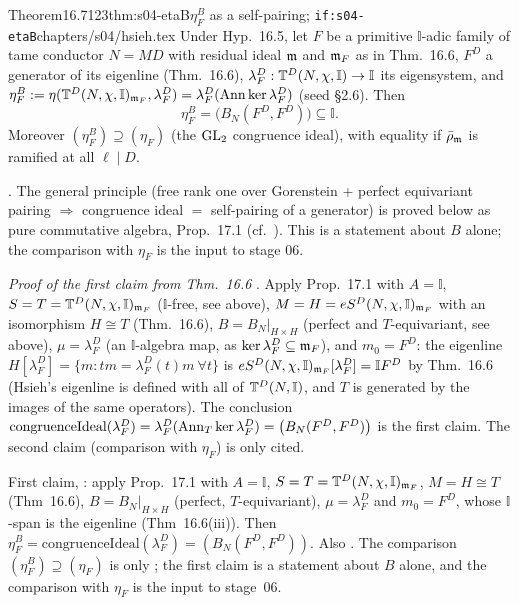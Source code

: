 \begin{quoted}{Theorem}{16.7}{123}{thm:s04-etaB}{$\eta^B_F$ as a self-pairing; \texttt{if:s04-etaB}}{chapters/s04/hsieh.tex}\label{rpt:thm:s04-etaB}
Under Hyp.~16.5, let $F$ be a primitive $\mathbb I$-adic family of tame conductor $N=MD$ with residual ideal $\mathfrak{m}$ and $\mathfrak{m}_F$ as in Thm.~16.6, $F^D$ a
generator of its eigenline (Thm.~16.6), $\lambda^D_F:\mathbb{T}^D(N,\chi,\mathbb I)\to\mathbb I$ its eigensystem, and
$\eta^B_F:=\eta(\mathbb{T}^D(N,\chi,\mathbb I)_{\mathfrak{m}_F},\lambda^D_F)=\lambda^D_F(\operatorname{Ann}\ker\lambda^D_F)$ (seed \S2.6). Then
\[\eta^B_F=\big(B_N(F^D,F^D)\big)\subseteq\mathbb I .\]
Moreover $(\eta^B_F)\supseteq(\eta_F)$ (the $\mathrm{GL}_2$ congruence ideal), with equality if $\bar\rho_{\mathfrak{m}}$ is ramified at all $\ell\mid D$.
\par\smallskip{}\par
\noindent\stcited{} \cite[{Def.~4.12, p.~43 ($\eta_{F^D}:=B_{N_F}(F^D,F^D)$);
Remark~7.8, p.~71 (it generates the congruence ideal of $\lambda_f:\T^D(N,\psi,\mathbb I)\to\mathbb I$ under (CR,$\Sigma^-$), and
$(\eta_{f^D})\supseteq(\eta_f)$, equality if ramified at all $\ell\in\Sigma^-$)}]{Hs}. The general principle (free rank one over Gorenstein
+ perfect equivariant pairing $\Rightarrow$ congruence ideal $=$ self-pairing of a generator) is proved below as pure commutative
algebra, Prop.~17.1 (cf.\ \cite[{Remark~7.3,
p.~67: $T$ Gorenstein, $H$ free of rank $d$ with perfect equivariant pairing $\Rightarrow C(\lambda)^d=(\det\langle e_i,e_j\rangle)$}]{Hs}). This is
a statement about $B$ alone; the comparison with $\eta_F$ is the input to stage 06.

\noindent\emph{Proof of the first claim from Thm.~16.6} \stpmc. Apply Prop.~17.1 with $A=\mathbb I$,
$S=T=\mathbb{T}^D(N,\chi,\mathbb I)_{\mathfrak{m}_F}$ ($\mathbb I$-free, see above), $M=H=eS^D(N,\chi,\mathbb I)_{\mathfrak{m}_F}$ with an isomorphism $H\cong T$
(Thm.~16.6), $B=B_N|_{H\times H}$ (perfect and $T$-equivariant, see above), $\mu=\lambda^D_F$ (an $\mathbb I$-algebra map, as
$\ker\lambda^D_F\subseteq\mathfrak{m}_F$), and $m_0=F^D$: the eigenline $H[\lambda^D_F]=\{m:tm=\lambda^D_F(t)m\ \forall t\}$ is
$eS^D(N,\chi,\mathbb I)_{\mathfrak{m}_F}[\lambda^D_F]=\mathbb I F^D$ by Thm.~16.6 (Hsieh's eigenline is defined with all of
$\mathbb{T}^D(N,\mathbb I)$, and $T$ is generated by the images of the same operators). The conclusion
$\mathrm{congruenceIdeal}(\lambda^D_F)=\lambda^D_F(\operatorname{Ann}_T\ker\lambda^D_F)=\big(B_N(F^D,F^D)\big)$ is the first claim. The second claim
(comparison with $\eta_F$) is only cited.
\end{quoted}
\begin{outline}
First claim, \stpmc: apply Prop.~17.1 with $A=\mathbb I$, $S=T=\mathbb{T}^D(N,\chi,\mathbb I)_{\mathfrak{m}_F}$, $M=H\cong T$ (Thm~16.6),
$B=B_N|_{H\times H}$ (perfect, $T$-equivariant), $\mu=\lambda^D_F$ and $m_0=F^D$, whose $\mathbb I$-span is the eigenline (Thm~16.6(iii)).
Then $\eta^B_F=\mathrm{congruenceIdeal}(\lambda^D_F)=(B_N(F^D,F^D))$. Also \stcited{} \cite[Def.~4.12, p.~43; Rem.~7.8, p.~71]{Hs}. The
comparison $(\eta^B_F)\supseteq(\eta_F)$ is only \stcited{} \cite[Rem.~7.8]{Hs}; the first claim is a statement about $B$ alone, and the comparison with $\eta_F$ is the input to stage~06.
\end{outline}

